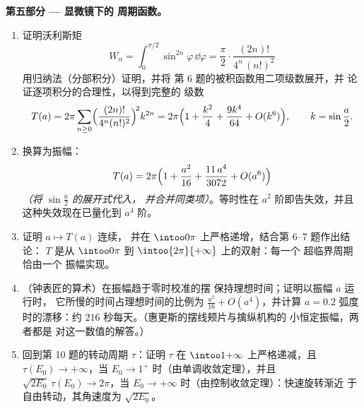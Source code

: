 \begin{problem}
\medskip
\noindent\textbf{第五部分 --- 显微镜下的
周期函数。}
\begin{enumerate}[resume]
  \item 证明沃利斯矩
        \[
        W_n = \int_0^{\pi/2}\sin^{2n}\varphi\,\dd\varphi
        = \frac\pi2\cdot\frac{(2n)!}{4^n\,(n!)^2}
        \]
        用归纳法（分部积分）证明，并将
        第 6 题的被积函数用二项级数展开，并
        论证逐项积分的合理性，以得到完整的
        级数
        \[
        T(a) = 2\pi\sum_{n\geq0}
        \Bigl(\frac{(2n)!}{4^n(n!)^2}\Bigr)^{\!2}k^{2n}
        = 2\pi\Bigl(1 + \frac{k^2}4 + \frac{9k^4}{64}
        + O(k^6)\Bigr),
        \qquad k = \sin\frac a2 .
        \]
  \item 换算为振幅：
        \[
        T(a) = 2\pi\Bigl(1 + \frac{a^2}{16} +
        \frac{11\,a^4}{3072} + O(a^6)\Bigr)
        \]
        \emph{（将 $\sin\frac a2$ 的展开式代入，
        并合并同类项）}。等时性在 $a^2$ 阶即告失效，并且
        这种失效现在已量化到 $a^4$ 阶。
  \item 证明 $a \mapsto T(a)$ 连续，
        并在 $\intoo0\pi$ 上严格递增，结合第 6--7 题作出结论：
        $T$ 是从
        $\intoo0\pi$ 到 $\intoo{2\pi}{+\infty}$ 上的双射：每一个
        超临界周期恰由一个
        振幅实现。
  \item （钟表匠的算术）在振幅趋于零时校准的摆
        保持理想时间；证明以振幅 $a$ 运行时，
        它所慢的时间占理想时间的比例为
        $\frac{a^2}{16} + O(a^4)$，并计算
        $a = 0.2$ 弧度时的漂移：约
        $216$ 秒每天。（惠更斯的摆线颊片与擒纵机构的
        小恒定振幅，两者都是
        对这一数值的解答。）
  \item 回到第
        10 题的转动周期 $\tau$：证明 $\tau$ 在
        $\intoo1{+\infty}$ 上严格递减，且 $\tau(E_0) \to +\infty$，当
        $E_0 \to 1^+$ 时（由单调收敛定理），并且
        $\sqrt{2E_0}\,\tau(E_0) \to 2\pi$，当 $E_0 \to
        +\infty$ 时（由控制收敛定理）：快速旋转渐近
        于自由转动，其角速度为
        $\sqrt{2E_0}$。
\end{enumerate}


\end{problem}
